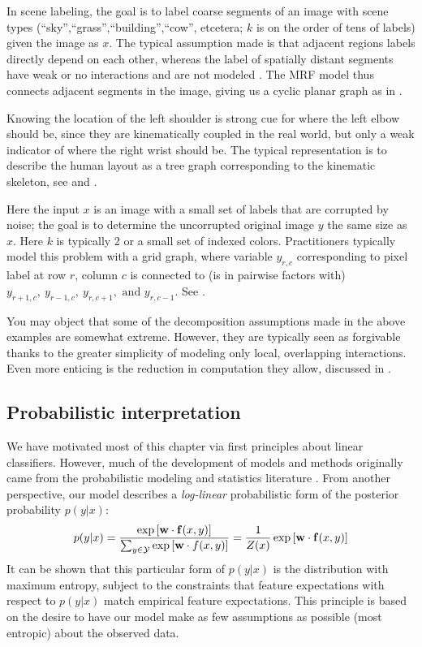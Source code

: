  In scene labeling, the goal is to label coarse segments 
of an image with scene types (``sky'',``grass'',``building'',``cow'', etcetera; 
$k$ is on the order of tens of labels) given the image as $x$. The typical 
assumption made is that adjacent regions labels directly depend on each other, 
whereas the label of spatially distant segments have weak or no interactions 
and are not modeled \citep{cour05}.  The MRF model thus connects adjacent 
segments in the image, giving us a cyclic planar graph as in
.

  Knowing the location of the left shoulder is 
strong cue for where the left elbow should be, since they are kinematically 
coupled in the real world, but only a weak indicator of where the right wrist 
should be.  The typical representation is to describe the human layout as a 
tree graph corresponding to the kinematic skeleton, 
see  and .


 Here the input $x$ is an image with a small set of 
labels that are corrupted by noise; the goal is to determine the uncorrupted 
original image $y$ the same size as $x$.  Here $k$ is typically 2 or a small 
set of indexed colors. Practitioners typically model this problem with a grid 
graph, where variable $y_{r,c}$ corresponding to pixel label at row $r$, column 
$c$ is connected to (is in pairwise factors with) 
$y_{r+1,c},~y_{r-1,c},~y_{r,c+1}, \text{ and } y_{r,c-1}$.  
See .

You may object that some of the decomposition assumptions made in the above 
examples are somewhat extreme.  However, they are typically seen as forgivable 
thanks to the greater simplicity of modeling only local, overlapping 
interactions. Even more enticing is the reduction in computation they allow, 
discussed in .

\subsection{Probabilistic interpretation}\label{sec:probinterp}
We have motivated most of this chapter via first principles about linear 
classifiers.  However, much of the development of models and methods originally 
came from the probabilistic modeling and statistics literature 
\citep{koller-book,esl-book,bishop-book}.  From another perspective, our model 
describes a {\em log-linear} probabilistic form of the posterior probability 
$p(y|x)$:
\begin{equation}
p(y|x)= \frac{\exp \left[ \mathbf{w} \cdot \mathbf{f}(x,y) \right]}{\sum_{y \in \mathcal{Y}} \exp \left[\mathbf{w} \cdot f(x,y) \right]} = \frac{1}{Z(x)} \exp \left[ \mathbf{w} \cdot \mathbf{f}(x,y) \right]
\end{equation}
It can be shown \citep{jaynes1963} that this particular form of $p(y|x)$ is the
distribution with maximum entropy, subject to the constraints that feature 
expectations with respect to $p(y|x)$ match empirical feature expectations.  
This principle is based on the desire to have our model make as few assumptions 
as possible (most entropic) about the observed data.

